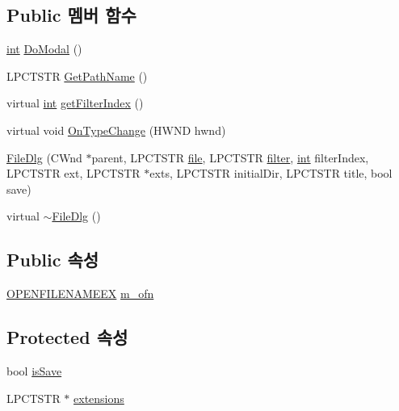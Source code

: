 \subsection*{Public 멤버 함수}
\begin{DoxyCompactItemize}
\item 
\mbox{\hyperlink{_util_8cpp_a0ef32aa8672df19503a49fab2d0c8071}{int}} \mbox{\hyperlink{class_file_dlg_a45b5a0d6b2d8a9b973864ab2b36e16e0}{Do\+Modal}} ()
\item 
L\+P\+C\+T\+S\+TR \mbox{\hyperlink{class_file_dlg_a52be84d9ca25a4d4dbb1f5e0ed1404bd}{Get\+Path\+Name}} ()
\item 
virtual \mbox{\hyperlink{_util_8cpp_a0ef32aa8672df19503a49fab2d0c8071}{int}} \mbox{\hyperlink{class_file_dlg_adee4c9560d3c2668654c50970f8e7f12}{get\+Filter\+Index}} ()
\item 
virtual void \mbox{\hyperlink{class_file_dlg_a91dbefc4d06bedc4bd956838180dc3e8}{On\+Type\+Change}} (H\+W\+ND hwnd)
\item 
\mbox{\hyperlink{class_file_dlg_a0a793ed11256c5a8d5d12d01e13e5eea}{File\+Dlg}} (C\+Wnd $\ast$parent, L\+P\+C\+T\+S\+TR \mbox{\hyperlink{expr-lex_8cpp_a702945180aa732857b380a007a7e2a21}{file}}, L\+P\+C\+T\+S\+TR \mbox{\hyperlink{_s_d_l_8cpp_af0122ee4312107103b580a98c74a4ea6}{filter}}, \mbox{\hyperlink{_util_8cpp_a0ef32aa8672df19503a49fab2d0c8071}{int}} filter\+Index, L\+P\+C\+T\+S\+TR ext, L\+P\+C\+T\+S\+TR $\ast$exts, L\+P\+C\+T\+S\+TR initial\+Dir, L\+P\+C\+T\+S\+TR title, bool save)
\item 
virtual \mbox{\hyperlink{class_file_dlg_a2c16975c30da7d9d32efe76c61082289}{$\sim$\+File\+Dlg}} ()
\end{DoxyCompactItemize}
\subsection*{Public 속성}
\begin{DoxyCompactItemize}
\item 
\mbox{\hyperlink{struct_o_p_e_n_f_i_l_e_n_a_m_e_e_x}{O\+P\+E\+N\+F\+I\+L\+E\+N\+A\+M\+E\+EX}} \mbox{\hyperlink{class_file_dlg_a3ee514d5dca456bd90c598af5412269a}{m\+\_\+ofn}}
\end{DoxyCompactItemize}
\subsection*{Protected 속성}
\begin{DoxyCompactItemize}
\item 
bool \mbox{\hyperlink{class_file_dlg_aea50dcea1e8ef52d9b61f9cd37a69c0f}{is\+Save}}
\item 
L\+P\+C\+T\+S\+TR $\ast$ \mbox{\hyperlink{class_file_dlg_a5ee21f6dd33189d20e302e994323d578}{extensions}}
\end{DoxyCompactItemize}


